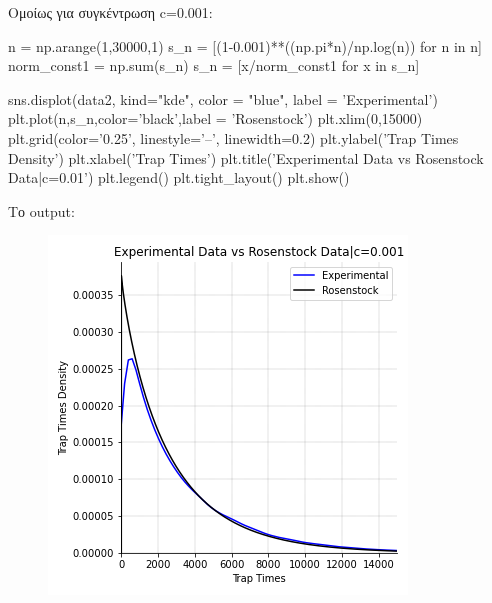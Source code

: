 \noindent
Ομοίως για συγκέντρωση {\en c=0.001}:
\en 
\begin{python}
n = np.arange(1,30000,1)
s_n = [(1-0.001)**((np.pi*n)/np.log(n)) for n in n]
norm_const1 = np.sum(s_n)
s_n = [x/norm_const1 for x in s_n]

sns.displot(data2, kind="kde", color = "blue", label = 'Experimental')
plt.plot(n,s_n,color='black',label = 'Rosenstock')
plt.xlim(0,15000)
plt.grid(color='0.25', linestyle='--', linewidth=0.2)
plt.ylabel('Trap Times Density')
plt.xlabel('Trap Times')
plt.title('Experimental Data vs Rosenstock Data|c=0.01')
plt.legend()
plt.tight_layout()
plt.show()
\end{python}
\gr 
\newpage
\noindent
Το {\en output}:
\begin{figure}[H]
\begin{center}
\includegraphics[scale=1]{figures/Rosenstock_0001.png}
\end{center}
\end{figure}